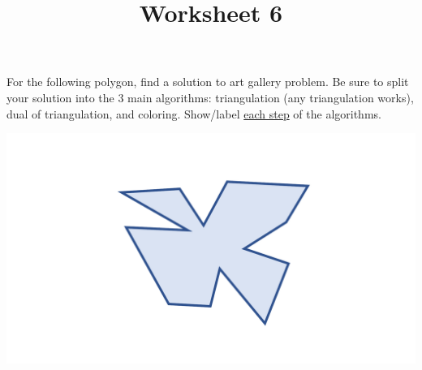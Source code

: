\documentclass[a4paper,12pt]{article}
\title{Worksheet 6}
\begin{document}
\maketitle

\worksheetGroundRules

\worksheetSubmission

\assignmentInstructions

For the following polygon, find a solution to art gallery problem. Be sure to split your solution into the 3 main algorithms: triangulation (any triangulation works), dual of triangulation, and coloring. Show/label \uline{each step} of the algorithms. 


\begin{center}
\includegraphics[width=0.75\linewidth]{../images/worksheet3.pdf}
\end{center}



\newpage
\end{document}

